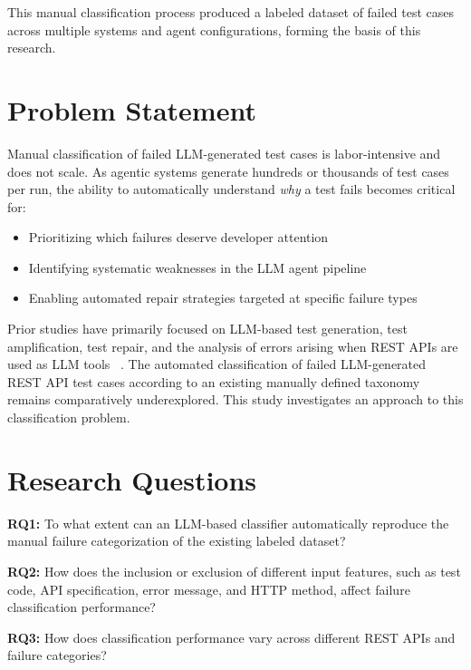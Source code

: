 \documentclass[12pt, a4paper]{article}
\begin{document}
This manual classification process produced a labeled dataset of failed test cases across multiple systems and agent configurations, forming the basis of this research.

\section{Problem Statement}

Manual classification of failed LLM-generated test cases is labor-intensive and does not scale. As agentic systems generate hundreds or thousands of test cases per run, the ability to automatically understand \textit{why} a test fails becomes critical for:

\begin{itemize}[leftmargin=1.5em, itemsep=3pt]
    \item Prioritizing which failures deserve developer attention
    \item Identifying systematic weaknesses in the LLM agent pipeline
    \item Enabling automated repair strategies targeted at specific failure types
\end{itemize}

Prior studies have primarily focused on LLM-based test generation,
test amplification, test repair, and the analysis of errors arising when
REST APIs are used as LLM tools
~\cite{wang2024softwaretesting,nooyens2025amplification,
bandlamudi2025framework}. The automated classification of failed
LLM-generated REST API test cases according to an existing manually
defined taxonomy remains comparatively underexplored. This study
investigates an approach to this classification problem.
\section{Research Questions}

\textbf{RQ1:} To what extent can an LLM-based classifier automatically reproduce the manual failure categorization of the existing labeled dataset?

\textbf{RQ2:} How does the inclusion or exclusion of different input
features, such as test code, API specification, error message, and HTTP
method, affect failure classification performance?


\textbf{RQ3:} How does classification performance vary across different REST APIs and failure categories?
\end{document}
